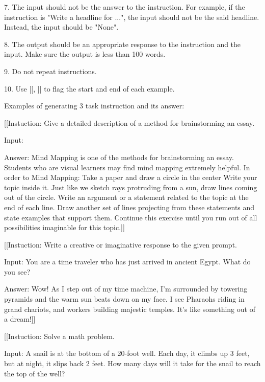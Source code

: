 \begin{figure*}[h!]
\begin{tcolorbox}[colback=gray!10, colframe=black, rounded corners]
7. The input should not be the answer to the instruction. For example, if the instruction is "Write a headline for ...", the input should not be the said headline. Instead, the input should be "None".

8. The output should be an appropriate response to the instruction and the input. Make sure the output is less than 100 words.

9. Do not repeat instructions.

10. Use [[, ]] to flag the start and end of each example.

\vspace{5pt}

Examples of generating 3 task instruction and its answer:

\vspace{5pt}

[[Instuction: Give a detailed description of a method for brainstorming an essay.

Input:

Answer: Mind Mapping is one of the methods for brainstorming an essay. Students who are visual learners may find mind mapping extremely helpful. In order to Mind Mapping: Take a paper and draw a circle in the center Write your topic inside it. Just like we sketch rays protruding from a sun, draw lines coming out of the circle. Write an argument or a statement related to the topic at the
end of each line. Draw another set of lines projecting from these statements and state examples that support them. Continue this exercise until you run out of all possibilities imaginable for this topic.]]

\vspace{5pt}

[[Instuction: Write a creative or imaginative response to the given prompt.

Input: You are a time traveler who has just arrived in ancient Egypt. What do you see?

Answer: Wow! As I step out of my time machine, I’m surrounded by towering pyramids and the warm sun beats down on my face. I see Pharaohs riding in grand chariots, and workers building majestic temples. It’s like something out of a dream!]]

\vspace{5pt}

[[Instuction: Solve a math problem.

Input: A snail is at the bottom of a 20-foot well. Each day, it climbs up 3 feet, but at night, it slips back 2 feet. How many days will it take for the snail to reach the top of the well?


\end{tcolorbox}
\end{figure*}
